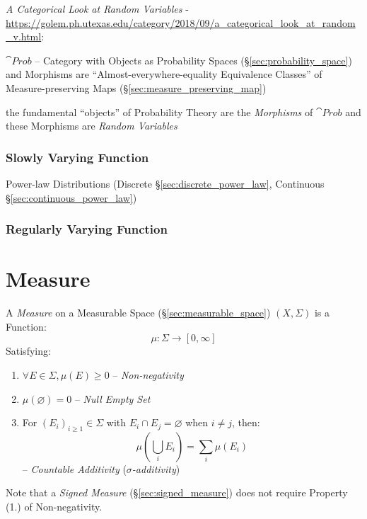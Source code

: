 \emph{A Categorical Look at Random Variables} -
\url{https://golem.ph.utexas.edu/category/2018/09/a_categorical_look_at_random_v.html}:

$\cat{Prob}$ -- Category with Objects as Probability Spaces
(\S\ref{sec:probability_space}) and Morphisms are ``Almost-everywhere-equality
Equivalence Classes'' of Measure-preserving Maps
(\S\ref{sec:measure_preserving_map})

the fundamental ``objects'' of Probability Theory are the \emph{Morphisms} of
$\cat{Prob}$ and these Morphisms are \emph{Random Variables}



\subsubsection{Slowly Varying Function}\label{sec:slowly_varying}

Power-law Distributions (Discrete \S\ref{sec:discrete_power_law}, Continuous
\S\ref{sec:continuous_power_law})



\subsubsection{Regularly Varying Function}\label{sec:regularly_varying}



\section{Measure}\label{sec:measure}

A \emph{Measure} on a Measurable Space (\S\ref{sec:measurable_space})
$(X,\Sigma)$ is a Function:
\[
  \mu : \Sigma \rightarrow [0,\infty]
\]
Satisfying:
\begin{enumerate}
  \item $\forall E \in \Sigma, \mu(E) \geq 0$ -- \emph{Non-negativity}
  \item $\mu(\varnothing) = 0$ -- \emph{Null Empty Set}
  \item For $(E_i)_{i \geq 1} \in \Sigma$ with $E_i \cap E_j = \varnothing$
    when $i \neq j$, then:
    \[
      \mu (\bigcup_i E_i) = \sum_i \mu(E_i)
    \]
    -- \emph{Countable Additivity} (\emph{$\sigma$-additivity})
\end{enumerate}
Note that a \emph{Signed Measure} (\S\ref{sec:signed_measure}) does not require
Property (1.) of Non-negativity.

